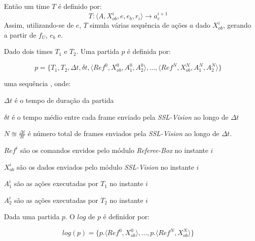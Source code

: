 \begin{defi}[Time]
\begin{description}
  \end{description}
  
  Então um time $T$ é definido por:
  \[
    T: \langle A, X_{ob}^{i}, e, e_b, r_i \rangle \longrightarrow a_c^{i+1}
  \]
  Assim, utilizando-se de $e$, $T$ simula várias sequência de ações $a$ dado $X_{ob}^{i}$,
  gerando  a partir de $f_{U}$, $e_b$ e.
\end{defi}

\begin{defi}[Partida]
  Dado dois times $T_1$ e $T_2$. Uma partida $p$ é definida por:
 
  \[
   p = \lbrace T_1, T_2, \Delta t, \delta t, \langle Ref^{0}, X_{ob}^{0}, A_1^{0}, A_2^{0}\rangle, 
    ..., \langle Ref^{N}, X_{ob}^{N}, A_1^{N}, A_2^{N} \rangle \rbrace
 \]
  
  uma sequência , onde:
  \begin{description}
    \item $\Delta t$ é o tempo de duração da partida
    \item $\delta t$ é o tempo médio entre cada frame enviado pela \textit{SSL-Vision} ao longo de $\Delta t$
    \item $N \approxeq \frac{\Delta t}{\delta t}$ é número total de frames enviados pela \textit{SSL-Vision}
  ao longo de $\Delta t$.
    \item $Ref^{i}$ são os comandos envidos pelo módulo \textit{Referee-Box} no instante $i$
    \item $X_{ob}^{i}$ são os dados enviados pelo módulo \textit{SSL-Vision} no instante $i$
    \item $A_1^{i}$ são as ações executadas por $T_1$ no instante $i$
    \item $A_2^{i}$ são as ações executadas por $T_2$ no instante $i$
  \end{description}
\end{defi}

\begin{defi}[Logs]
  Dada uma partida $p$. O $log$ de $p$ é definidor por:

  \[
    log(p) = \lbrace p.\langle Ref^{0}, X_{ob}^{0}\rangle, ..., p.\langle Ref^{N}, X_{ob}^{N}\rangle \rbrace
  \]
\end{defi}